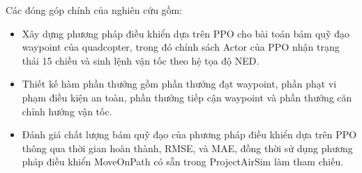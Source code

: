 Các đóng góp chính của nghiên cứu gồm:

\begin{itemize}
    \item Xây dựng phương pháp điều khiển dựa trên PPO cho bài toán bám quỹ đạo waypoint của quadcopter, trong đó chính sách Actor của PPO nhận trạng thái 15 chiều và sinh lệnh vận tốc theo hệ tọa độ NED.
    \item Thiết kế hàm phần thưởng gồm phần thưởng đạt waypoint, phần phạt vi phạm điều kiện an toàn, phần thưởng tiếp cận waypoint và phần thưởng căn chỉnh hướng vận tốc.
    \item Đánh giá chất lượng bám quỹ đạo của phương pháp điều khiển dựa trên PPO thông qua thời gian hoàn thành, RMSE, và MAE, đồng thời sử dụng phương pháp điều khiển MoveOnPath có sẵn trong ProjectAirSim làm tham chiếu.
\end{itemize}

